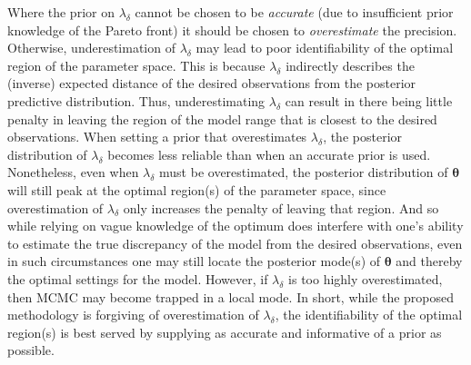 \documentclass[12pt]{article}
\begin{document}
Where the prior on $\lambda_\delta$ cannot be chosen to be \emph{accurate} (due to insufficient prior knowledge of the Pareto front) it should be chosen to \emph{overestimate} the precision.
%
Otherwise, underestimation of $\lambda_\delta$ may lead to poor identifiability of the optimal region of the parameter space.
%
This is because $\lambda_\delta$ indirectly describes the (inverse) expected distance of the desired observations from the posterior predictive distribution.
%
Thus, underestimating $\lambda_\delta$ can result in there being little penalty in leaving the region of the model range that is closest to the desired observations.
%
When setting a prior that overestimates $\lambda_\delta$, the posterior distribution of $\lambda_\delta$ becomes less reliable than when an accurate prior is used.
%
Nonetheless, even when $\lambda_\delta$ must be overestimated, the posterior distribution of $\boldsymbol \theta$ will still peak at the optimal region(s) of the parameter space, since overestimation of $\lambda_\delta$ only increases the penalty of leaving that region.
%
And so while relying on vague knowledge of the optimum does interfere with one's ability to estimate the true discrepancy of the model from the desired observations, even in such circumstances one may still locate the posterior mode(s) of $\boldsymbol \theta$ and thereby the optimal settings for the model.
%
However, if $\lambda_\delta$ is too highly overestimated, then MCMC may become trapped in a local mode. 
%
In short, while the proposed methodology is forgiving of overestimation of $\lambda_\delta$, the identifiability of the optimal region(s) is best served by supplying as accurate and informative of a prior as possible. 
\end{document}
